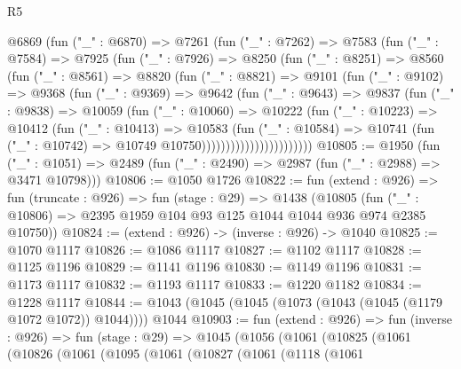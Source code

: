 \begin{lexlean}{R5}
\begin{coremodule}
                @6869
                  (fun ("_" : @6870) =>
                  @7261
                    (fun ("_" : @7262) =>
                    @7583
                      (fun ("_" : @7584) =>
                      @7925
                        (fun ("_" : @7926) =>
                        @8250
                          (fun ("_" : @8251) =>
                          @8560
                            (fun ("_" : @8561) =>
                            @8820
                              (fun ("_" : @8821) =>
                              @9101
                                (fun ("_" : @9102) =>
                                @9368
                                  (fun ("_" : @9369) =>
                                  @9642
                                    (fun ("_" : @9643) =>
                                    @9837
                                      (fun ("_" : @9838) =>
                                      @10059
                                        (fun ("_" : @10060) =>
                                        @10222
                                          (fun ("_" : @10223) =>
                                          @10412
                                            (fun ("_" : @10413) =>
                                            @10583
                                              (fun ("_" : @10584) =>
                                              @10741
                                                (fun ("_" : @10742) =>
                                                @10749 @10750)))))))))))))))))))))))
@10805 := @1950
    (fun ("_" : @1051) => @2489 (fun ("_" : @2490) => @2987 (fun ("_" : @2988) => @3471 @10798)))
@10806 := @1050 @1726
@10822 := fun (extend : @926) =>
  fun (truncate : @926) =>
  fun (stage : @29) =>
  @1438
    (@10805 (fun ("_" : @10806) => @2395 @1959 @104 @93 @125 @1044 @1044 @936 @974 @2385 @10750))
@10824 := (extend : @926) -> (inverse : @926) -> @1040
@10825 := @1070 @1117
@10826 := @1086 @1117
@10827 := @1102 @1117
@10828 := @1125 @1196
@10829 := @1141 @1196
@10830 := @1149 @1196
@10831 := @1173 @1117
@10832 := @1193 @1117
@10833 := @1220 @1182
@10834 := @1228 @1117
@10844 := @1043 (@1045 (@1045 (@1073 (@1043 (@1045 (@1179 @1072 @1072)) @1044)))) @1044
@10903 := fun (extend : @926) =>
  fun (inverse : @926) =>
  fun (stage : @29) =>
  @1045
    (@1056
      (@1061
        (@10825
          (@1061
            (@10826
              (@1061
                (@1095
                  (@1061
                    (@10827
                      (@1061
                        (@1118
                          (@1061

\end{coremodule}
\end{lexlean}
